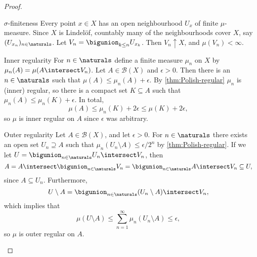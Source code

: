 \documentclass[article, a4paper, 11pt, oneside]{memoir}
\numberwithin{equation}{chapter}
\newcommand{\calB}{\mathcal{B}}
\newcommand{\borel}[1]{\calB(#1)}
\begin{document}
\begin{proof}
\begin{proofsec}
    \item[$\sigma$-finiteness]
    Every point $x \in X$ has an open neighbourhood $U_x$ of finite $\mu$-measure. Since $X$ is Lindelöf, countably many of the neighbourhoods cover $X$, say $(U_{x_n})_{n \in \naturals}$. Let $V_n = \bigunion_{k \leq n} U_{x_k}$. Then $V_n \uparrow X$, and $\mu(V_n) < \infty$.

    \item[Inner regularity]
    For $n \in \naturals$ define a finite measure $\mu_n$ on $X$ by $\mu_n(A) = \mu(A \intersect V_n)$. Let $A \in \borel{X}$ and $\epsilon > 0$. Then there is an $n \in \naturals$ such that $\mu(A) \leq \mu_n(A) + \epsilon$. By \cref{thm:Polish-regular} $\mu_n$ is (inner) regular, so there is a compact set $K \subseteq A$ such that $\mu_n(A) \leq \mu_n(K) + \epsilon$. In total,
    \begin{equation*}
        \mu(A)
            \leq \mu_n(K) + 2\epsilon
            \leq \mu(K) + 2\epsilon,
    \end{equation*}
    so $\mu$ is inner regular on $A$ since $\epsilon$ was arbitrary.

    \item[Outer regularity]
    Let $A \in \borel{X}$, and let $\epsilon > 0$. For $n \in \naturals$ there exists an open set $U_n \supseteq A$ such that $\mu_n(U_n \setminus A) \leq \epsilon/2^n$ by \cref{thm:Polish-regular}. If we let $U = \bigunion_{n\in\naturals} U_n \intersect V_n$, then
    \begin{equation*}
        A
            = A \intersect \bigunion_{n\in\naturals} V_n
            = \bigunion_{n\in\naturals} A \intersect V_n
            \subseteq U,
    \end{equation*}
    since $A \subseteq U_n$. Furthermore,
    \begin{equation*}
        U \setminus A
            = \bigunion_{n\in\naturals} (U_n \setminus A) \intersect V_n,
    \end{equation*}
    which implies that
    \begin{equation*}
        \mu(U \setminus A)
            \leq \sum_{n=1}^\infty \mu_n(U_n \setminus A)
            \leq \epsilon,
    \end{equation*}
    so $\mu$ is outer regular on $A$.
\end{proofsec}
\end{proof}
\end{document}
